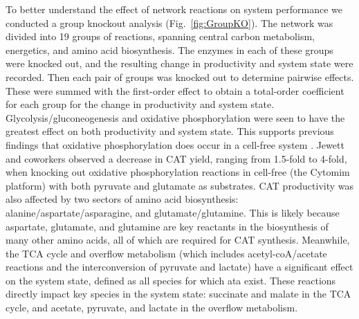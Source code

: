 \documentclass[12pt]{article}
\begin{document}
To better understand the effect of network reactions on system performance we conducted a group knockout analysis (Fig.~\ref{fig:GroupKO}).
The network was divided into 19 groups of reactions, spanning central carbon metabolism, energetics, and amino acid biosynthesis.
The enzymes in each of these groups were knocked out, and the resulting change in productivity and system state were recorded.
Then each pair of groups was knocked out to determine pairwise effects.
These were summed with the first-order effect to obtain a total-order coefficient for each group for the change in productivity and system state.
Glycolysis\slash gluconeogenesis and oxidative phosphorylation were seen to have the greatest effect on both productivity and system state.
This supports previous findings that oxidative phosphorylation does occur in a cell-free system \cite{Jewett:2008aa}.
Jewett and coworkers observed a decrease in CAT yield, ranging from 1.5-fold to 4-fold, when knocking out oxidative phosphorylation reactions in cell-free (the Cytomim platform) with both pyruvate and glutamate as substrates.
CAT productivity was also affected by two sectors of amino acid biosynthesis: alanine\slash aspartate\slash asparagine, and glutamate\slash glutamine.
This is likely because aspartate, glutamate, and glutamine are key reactants in the biosynthesis of many other amino acids, all of which are required for CAT synthesis.
Meanwhile, the TCA cycle and overflow metabolism (which includes acetyl-coA\slash acetate reactions and the interconversion of pyruvate and lactate) have a significant effect on the system state, defined as all species for which ata exist.
These reactions directly impact key species in the system state: succinate and malate in the TCA cycle, and acetate, pyruvate, and lactate in the overflow metabolism.
\end{document}
